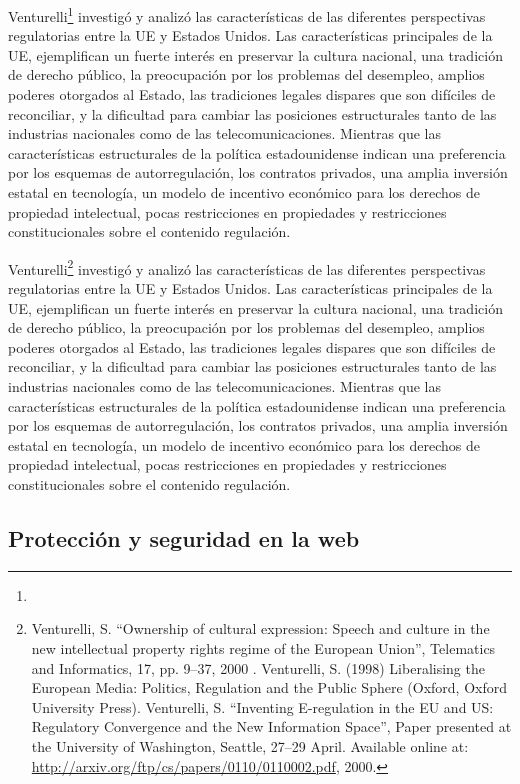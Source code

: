 \documentclass[12pt]{report} %
\begin{document}
Venturelli\footnote{}  investigó y analizó las características de las diferentes perspectivas regulatorias entre la UE y Estados Unidos. Las características principales de la UE, ejemplifican un fuerte interés en preservar la cultura nacional, una tradición de derecho público, la preocupación por los problemas del desempleo, amplios poderes otorgados al Estado, las tradiciones legales dispares que son difíciles de reconciliar, y la dificultad para cambiar las posiciones estructurales tanto de las industrias nacionales como de las telecomunicaciones. Mientras que las características estructurales de la política estadounidense indican una preferencia por los esquemas de autorregulación, los contratos privados, una amplia inversión estatal en tecnología, un modelo de incentivo económico para los derechos de propiedad intelectual, pocas restricciones en propiedades y restricciones constitucionales sobre el contenido regulación.

Venturelli\footnote{Venturelli, S. “Ownership of cultural expression: Speech and culture in the new intellectual
property rights regime of the European Union”, Telematics and Informatics, 17, pp. 9–37, 2000 . Venturelli, S. (1998) Liberalising the European Media: Politics, Regulation and the Public Sphere (Oxford,
Oxford University Press).
Venturelli, S. “Inventing E-regulation in the EU and US: Regulatory Convergence and the
New Information Space”, Paper presented at the University of Washington, Seattle, 27–29 April.
Available online at: \url{http://arxiv.org/ftp/cs/papers/0110/0110002.pdf}, 2000.
}  investigó y analizó las características de las diferentes perspectivas regulatorias entre la UE y Estados Unidos. Las características principales de la UE, ejemplifican un fuerte interés en preservar la cultura nacional, una tradición de derecho público, la preocupación por los problemas del desempleo, amplios poderes otorgados al Estado, las tradiciones legales dispares que son difíciles de reconciliar, y la dificultad para cambiar las posiciones estructurales tanto de las industrias nacionales como de las telecomunicaciones. Mientras que las características estructurales de la política estadounidense indican una preferencia por los esquemas de autorregulación, los contratos privados, una amplia inversión estatal en tecnología, un modelo de incentivo económico para los derechos de propiedad intelectual, pocas restricciones en propiedades y restricciones constitucionales sobre el contenido regulación.

\subsection{Protección y seguridad en la web}
\end{document}
